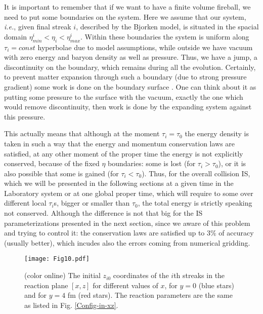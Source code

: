 \documentclass[aps,prc,twocolumn,floatfix,showpacs,a4paper,
nofootinbib,amsmath,amssymb]{revtex4-1}
\begin{document}
It is important to remember that if we want to have a finite volume fireball, we need to put some boundaries on the system. Here we assume that our system, {\it i.e.}, given final streak $i$,  described by the Bjorken model, is situated in the spacial domain $\eta^i_{min}<\eta_i<\eta^i_{max}$. Within these boundaries the system is uniform along $\tau_i = const$ hyperbolae due to model assumptions, while outside we have vacuum with zero energy and baryon density as well as pressure. Thus, we have a jump, a discontinuity on the boundary, which remains during all the evolution. Certainly, to prevent matter expansion through such a boundary (due to strong pressure gradient) some work is done on the boundary surface \cite{Bjorken_work}. One can think about it as putting some pressure to the surface with the vacuum, exactly the one which would remove discontinuity, then work is done by the expanding system against this pressure. 

This actually means that although at the moment $\tau_i=\tau_0$  the energy density is taken in such a way that the energy and momentum conservation laws are satisfied, at any other moment of the proper time the energy is not explicitly conserved, because of the fixed $\eta$ boundaries: some is lost (for $\tau_i > \tau_0$), or it is also possible that some is  gained  (for $\tau_i < \tau_0$). Thus, for the overall collision IS, which we will be presented in the following sections at a given time in the Laboratory system or at one global proper time, which will require to some over different local $\tau_i$s, bigger or smaller than $\tau_0$, the total energy is strictly speaking not conserved. Although the difference is not that big for the IS parameterizations presented in the next section, since we aware of this problem and trying to control it: the conservation laws are satisfied up to 3$\%$ of accuracy (usually better), which incudes also the errors coming from numerical gridding.




\begin{figure}[htb]     %
\begin{center}
\resizebox{1.01\columnwidth}{!}
{\texttt{[image: Fig10.pdf]}}
\caption{ (color online)
The initial $z_{i0}$ coordinates of the $i$th streaks in the reaction 
plane $[x,z]$ for different values of $x$, for $y=0$
(blue stars) and for $y = 4$ fm (red stars).
The reaction parameters are the same as 
listed in Fig. \ref{Config-in-xz}.
}
\label{z0i}
\end{center}
\end{figure}        %
\end{document}
